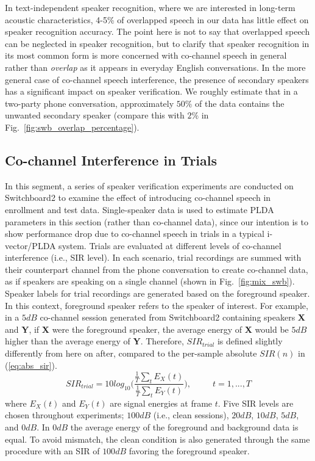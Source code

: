In text-independent speaker recognition, where we are interested in long-term acoustic characteristics, 4-5\% of overlapped speech in our data has little effect on speaker recognition accuracy. The point here is not to say that overlapped speech can be neglected in speaker recognition, but to clarify that speaker recognition in its most common form is more concerned with co-channel speech in general rather than {\it overlap} as it appears in everyday English conversations. 
In the more general case of co-channel speech interference, the presence of secondary speakers has a significant impact on speaker verification. 
We roughly estimate that in a two-party phone conversation, approximately $50\%$ of the data contains the unwanted secondary speaker (compare this with $2\%$ in Fig.~\ref{fig:swb_overlap_percentage}). 


\subsection{Co-channel Interference in Trials}

In this segment, a series of speaker verification experiments are conducted on Switchboard2 to examine the effect of introducing co-channel speech in enrollment and test data. 
Single-speaker data is used to estimate PLDA parameters in this section (rather than co-channel data), since our intention is to show performance drop due to co-channel speech in trials in a typical i-vector/PLDA system. 
Trials are evaluated at different levels of co-channel interference (i.e., SIR level). 
In each scenario, trial recordings are summed with their counterpart channel from the phone conversation to create co-channel data, as if speakers are speaking on a single channel (shown in Fig.~\ref{fig:mix_swb}). 
Speaker labels for trial recordings are generated based on the foreground speaker. 
In this context, foreground speaker refers to the speaker of interest. 
For example, in a $5dB$ co-channel session generated from Switchboard2 containing speakers {\bf X} and {\bf Y}, if {\bf X} were the foreground speaker, the average energy of {\bf X} would be $5dB$ higher than the average energy of {\bf Y}. 
Therefore, $SIR_{trial}$ is defined slightly differently from here on after, compared to the per-sample absolute $SIR(n)$ in (\ref{eq:abs_sir}). 
\begin{equation} 
SIR_{trial} = 10log_{10}\Big(\frac{\frac{1}{T}\sum_t E_X(t)}{\frac{1}{T}\sum_t E_Y(t)}\Big), \hspace{30pt} t=1,...,T
\end{equation}
where $E_X(t)$ and $E_Y(t)$ are signal energies at frame $t$. 
Five SIR levels are chosen throughout experiments; $100dB$ (i.e., clean sessions), $20dB$, $10dB$, $5dB$, and $0dB$. 
In $0dB$ the average energy of the foreground and background data is equal. 
To avoid mismatch, the clean condition is also generated through the same procedure with an SIR of $100dB$ favoring the foreground speaker. 

